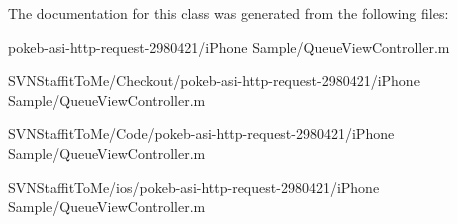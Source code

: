 \-The documentation for this class was generated from the following files\-:\begin{DoxyCompactItemize}
\item 
pokeb-\/asi-\/http-\/request-\/2980421/i\-Phone Sample/\-Queue\-View\-Controller.\-m\item 
\-S\-V\-N\-Staffit\-To\-Me/\-Checkout/pokeb-\/asi-\/http-\/request-\/2980421/i\-Phone Sample/\-Queue\-View\-Controller.\-m\item 
\-S\-V\-N\-Staffit\-To\-Me/\-Code/pokeb-\/asi-\/http-\/request-\/2980421/i\-Phone Sample/\-Queue\-View\-Controller.\-m\item 
\-S\-V\-N\-Staffit\-To\-Me/ios/pokeb-\/asi-\/http-\/request-\/2980421/i\-Phone Sample/\-Queue\-View\-Controller.\-m\end{DoxyCompactItemize}
